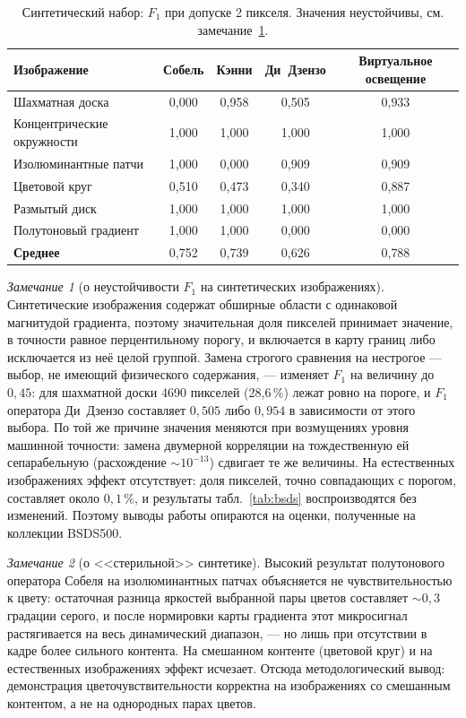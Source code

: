 \documentclass[11pt,a4paper]{article}
\theoremstyle{plain}
\theoremstyle{definition}
\theoremstyle{remark}
\newtheorem{remark}{Замечание}
\begin{document}
\begin{table}[h]
\centering
\caption{Синтетический набор: $F_1$ при допуске 2 пикселя. Значения
неустойчивы, см. замечание~\ref{rem:ties}.}
\label{tab:synth}
\begin{tabular}{lcccc}
\toprule
Изображение & Собель & Кэнни & Ди~Дзензо & Виртуальное освещение \\
\midrule
Шахматная доска            & 0{,}000 & 0{,}958 & 0{,}505 & 0{,}933 \\
Концентрические окружности & 1{,}000 & 1{,}000 & 1{,}000 & 1{,}000 \\
Изолюминантные патчи       & 1{,}000 & 0{,}000 & 0{,}909 & 0{,}909 \\
Цветовой круг              & 0{,}510 & 0{,}473 & 0{,}340 & 0{,}887 \\
Размытый диск              & 1{,}000 & 1{,}000 & 1{,}000 & 1{,}000 \\
Полутоновый градиент       & 1{,}000 & 1{,}000 & 0{,}000 & 0{,}000 \\
\midrule
\textbf{Среднее}           & 0{,}752 & 0{,}739 & 0{,}626 & 0{,}788 \\
\bottomrule
\end{tabular}
\end{table}

\begin{remark}[о неустойчивости $F_1$ на синтетических изображениях]
\label{rem:ties}
Синтетические изображения содержат обширные области с одинаковой
магнитудой градиента, поэтому значительная доля пикселей принимает
значение, в точности равное перцентильному порогу, и включается в карту
границ либо исключается из неё целой группой. Замена строгого сравнения
на нестрогое --- выбор, не имеющий физического содержания, --- изменяет
$F_1$ на величину до $0{,}45$: для шахматной доски 4690 пикселей
(28{,}6\,\%) лежат ровно на пороге, и $F_1$ оператора Ди~Дзензо составляет
$0{,}505$ либо $0{,}954$ в зависимости от этого выбора. По той же причине
значения меняются при возмущениях уровня машинной точности: замена
двумерной корреляции на тождественную ей сепарабельную (расхождение
${\sim}10^{-13}$) сдвигает те же величины. На естественных изображениях
эффект отсутствует: доля пикселей, точно совпадающих с порогом,
составляет около $0{,}1\,\%$, и результаты табл.~\ref{tab:bsds}
воспроизводятся без изменений. Поэтому выводы работы опираются на
оценки, полученные на коллекции BSDS500.
\end{remark}

\begin{remark}[о <<стерильной>> синтетике]
Высокий результат полутонового оператора Собеля на изолюминантных патчах
объясняется не чувствительностью к цвету: остаточная разница яркостей
выбранной пары цветов составляет ${\sim}0{,}3$ градации серого, и после
нормировки карты градиента этот микросигнал растягивается на весь
динамический диапазон, --- но лишь при отсутствии в кадре более сильного
контента. На смешанном контенте (цветовой круг) и на естественных
изображениях эффект исчезает. Отсюда методологический вывод: демонстрация
цветочувствительности корректна на изображениях со смешанным контентом,
а не на однородных парах цветов.
\end{remark}
\end{document}
